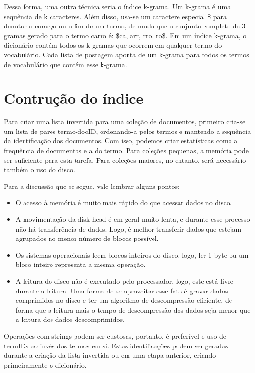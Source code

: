   Dessa forma, uma outra técnica seria o índice k-grama. Um k-grama é uma sequência de k caracteres. Além disso, usa-se um caractere especial \$ para denotar o começo ou o fim de um termo, de modo que o conjunto completo de 3-gramas gerado para o termo carro é: \$ca, arr, rro, ro\$. Em um índice k-grama, o dicionário contém todos os k-gramas que ocorrem em qualquer termo do  vocabulário. Cada lista de postagem aponta de um k-grama para todos os termos de vocabulário que contém esse k-grama.

\section{Contrução do índice}
\label{sec:construcao_indice}

Para criar uma lista invertida para uma coleção de documentos, primeiro cria-se um lista de pares termo-docID, ordenando-a pelos termos e mantendo a sequência da identificação dos documentos. Com isso, podemos criar estatísticas como a frequência de documentos e a do termo. Para coleções pequenas, a memória pode ser suficiente para esta tarefa. Para coleções maiores, no entanto, será necessário também o uso do disco.

Para a discussão que se segue, vale lembrar alguns pontos:
\begin{itemize}
\item O acesso à memória é muito mais rápido do que acessar dados no disco.
\item A movimentação da disk head é em geral muito lenta, e durante esse processo não há transferência de dados. Logo, é melhor transferir dados que estejam agrupados no menor número de blocos possível.
\item Os sistemas operacionais leem blocos inteiros do disco, logo, ler 1 byte ou um bloco inteiro representa a mesma operação.
\item A leitura do disco não é executado pelo processador, logo, este está livre durante a leitura. Uma forma de se aproveitar esse fato é gravar dados comprimidos no disco e ter um algoritmo de descompressão eficiente, de forma que a leitura mais o tempo de descompressão dos dados seja menor que a leitura dos dados descomprimidos.
\end{itemize}


Operações com strings podem ser custosas, portanto, é preferível o uso de termIDs ao invés dos termos em si. Estas identificações podem ser geradas durante a criação da lista invertida ou em uma etapa anterior, criando primeiramente o dicionário.

